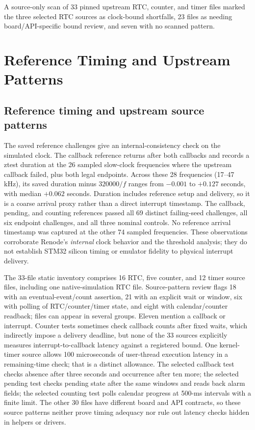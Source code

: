 A source-only scan of 33 pinned upstream RTC, counter, and timer files marked the three selected RTC sources as clock-bound shortfalls, 23 files as needing board/API-specific bound review, and seven with no scanned pattern.


\section{Reference Timing and Upstream Patterns}\label{app:reference}
\subsection{Reference timing and upstream source patterns}
The saved reference challenges give an internal-consistency check on the simulated clock. The callback reference returns after both callbacks and records a ztest duration at the 26 sampled slow-clock frequencies where the upstream callback failed, plus both legal endpoints. Across these 28 frequencies (17--47 kHz), its saved duration minus $320000/f$ ranges from $-0.001$ to $+0.127$ seconds, with median $+0.062$ seconds. Duration includes reference setup and delivery, so it is a coarse arrival proxy rather than a direct interrupt timestamp. The callback, pending, and counting references passed all 69 distinct failing-seed challenges, all six endpoint challenges, and all three nominal controls. No reference arrival timestamp was captured at the other 74 sampled frequencies. These observations corroborate Renode's \emph{internal} clock behavior and the threshold analysis; they do not establish STM32 silicon timing or emulator fidelity to physical interrupt delivery.

The 33-file static inventory comprises 16 RTC, five counter, and 12 timer source files, including one native-simulation RTC file. Source-pattern review flags 18 with an eventual-event/count assertion, 21 with an explicit wait or window, six with polling of RTC/counter/timer state, and eight with calendar/counter readback; files can appear in several groups. Eleven mention a callback or interrupt. Counter tests sometimes check callback counts after fixed waits, which indirectly impose a delivery deadline, but none of the 33 sources explicitly measures interrupt-to-callback latency against a registered bound. One kernel-timer source allows 100 microseconds of user-thread execution latency in a remaining-time check; that is a distinct allowance. The selected callback test checks absence after three seconds and occurrence after ten more; the selected pending test checks pending state after the same windows and reads back alarm fields; the selected counting test polls calendar progress at 500-ms intervals with a finite limit. The other 30 files have different board and API contracts, so these source patterns neither prove timing adequacy nor rule out latency checks hidden in helpers or drivers.


